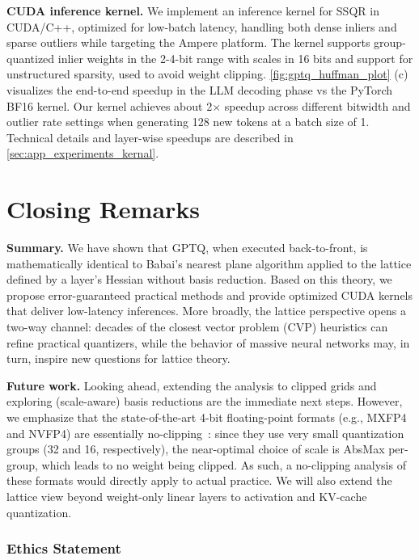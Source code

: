 \documentclass{article} %
\begin{document}
\textbf{CUDA inference kernel.}
We implement an inference kernel for SSQR in CUDA/C++, optimized for low-batch latency, handling both dense inliers and sparse outliers while targeting the Ampere platform. The kernel supports group-quantized inlier weights in the 2-4-bit range with scales in 16 bits and support for unstructured sparsity, used to avoid weight clipping.
\cref{fig:gptq_huffman_plot} (c) visualizes the end-to-end speedup in the LLM decoding phase vs the PyTorch BF16 kernel. Our kernel achieves about 2$\times$ speedup across different bitwidth and outlier rate settings when generating 128 new tokens at a batch size of 1. Technical details and layer-wise speedups are described in \cref{sec:app_experiments_kernal}.

\section{Closing Remarks}
\label{sec:conclusion}

\textbf{Summary.}
We have shown that GPTQ, when executed back-to-front, is mathematically identical to Babai's nearest plane algorithm applied to the lattice defined by a layer's Hessian without basis reduction.
Based on this theory, we propose error-guaranteed practical methods and provide optimized CUDA kernels that deliver low-latency inferences.
More broadly, the lattice perspective opens a two-way channel: decades of the closest vector problem (CVP) heuristics can refine practical quantizers, while the behavior of massive neural networks may, in turn, inspire new questions for lattice theory.

\textbf{Future work.}
Looking ahead, extending the analysis to clipped grids and exploring (scale-aware) basis reductions are the immediate next steps.
However, we emphasize that the state-of-the-art 4-bit floating-point formats (e.g., MXFP4 and NVFP4) are essentially no-clipping~\citep{egiazarian2025bridginggappromiseperformance,chen2026wushnearoptimaladaptivetransforms}: since they use very small quantization groups (32 and 16, respectively), the near-optimal choice of scale is AbsMax per-group, which leads to no weight being clipped. As such, a no-clipping analysis of these formats would directly apply to actual practice.
We will also extend the lattice view beyond weight-only linear layers to activation and KV-cache quantization.

\subsubsection*{Ethics Statement}
\end{document}
